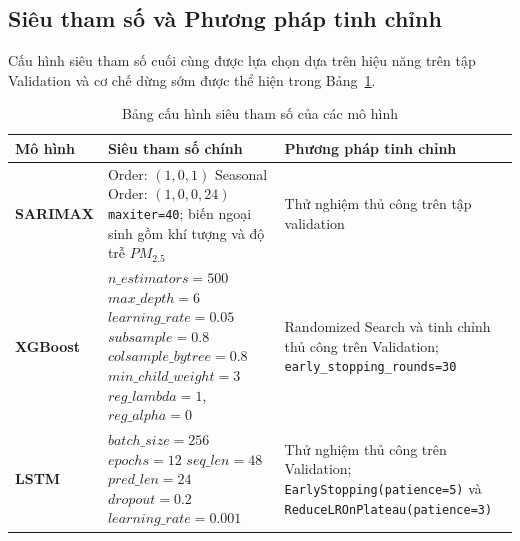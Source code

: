 \documentclass[12pt,a4paper]{article}
\begin{document}
\subsection{Siêu tham số và Phương pháp tinh chỉnh}

Cấu hình siêu tham số cuối cùng được lựa chọn dựa trên hiệu năng trên tập Validation và cơ chế dừng sớm được thể hiện trong Bảng~\ref{tab:hyperparams}.

\begin{table}[H]
    \centering
    \caption{Bảng cấu hình siêu tham số của các mô hình}
    \label{tab:hyperparams}
    \begin{tabularx}{\textwidth}{l >{\raggedright\arraybackslash}X >{\raggedright\arraybackslash}X}
        \toprule
        \textbf{Mô hình} & \textbf{Siêu tham số chính} & \textbf{Phương pháp tinh chỉnh} \\
        \midrule
        \textbf{SARIMAX} & Order: $(1, 0, 1)$ \newline Seasonal Order: $(1, 0, 0, 24)$ \newline \texttt{maxiter=40}; biến ngoại sinh gồm khí tượng và độ trễ $PM_{2.5}$ & Thử nghiệm thủ công trên tập validation \\
        \addlinespace
        \textbf{XGBoost} & $n\_estimators = 500$ \newline $max\_depth = 6$ \newline $learning\_rate = 0.05$ \newline $subsample = 0.8$ \newline $colsample\_bytree = 0.8$ \newline $min\_child\_weight = 3$ \newline $reg\_lambda = 1$, $reg\_alpha = 0$ & Randomized Search và tinh chỉnh thủ công trên Validation; \texttt{early\_stopping\_rounds=30} \\
        \addlinespace
        \textbf{LSTM} & $batch\_size = 256$ \newline $epochs = 12$ \newline $seq\_len = 48$ \newline $pred\_len = 24$ \newline $dropout = 0.2$ \newline $learning\_rate = 0.001$ & Thử nghiệm thủ công trên Validation; \texttt{EarlyStopping(patience=5)} và \texttt{ReduceLROnPlateau(patience=3)} \\
        \bottomrule
    \end{tabularx}
\end{table}
\end{document}
